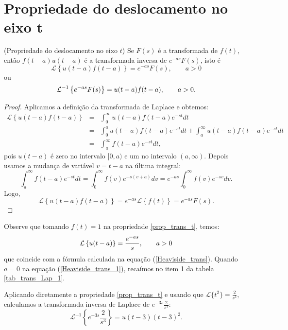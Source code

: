  \section{Propriedade do deslocamento no eixo t}
\begin{teo}{\label{prop_trans_t}}(Propriedade do deslocamento no eixo $t$) Se $F(s)$ é a transformada de $f(t)$, então $f(t-a)u(t-a)$ é a transformada inversa de $e^{-as}F(s)$, isto é
\begin{equation}
\mathcal{L}\left\{u(t-a)f(t-a)\right\} =e^{-as}F(s),\qquad a>0
\end{equation}
ou
\begin{equation}{\label{eq_trans_t_inv}}
\mathcal{L}^{-1} \left\{e^{-as}F(s)\right\} =u(t-a)f(t-a),\qquad a>0.
\end{equation}
\end{teo}
\begin{proof}Aplicamos a definição da transformada de Laplace e obtemos:
\begin{eqnarray*}
\mathcal{L}\left\{u(t-a)f(t-a)\right\}&=&\int_0^\infty u(t-a)f(t-a)e^{-st}dt\\
&=&\int_0^a u(t-a)f(t-a)e^{-st}dt+\int_a^\infty u(t-a)f(t-a)e^{-st}dt\\
&=&\int_a^\infty f(t-a)e^{-st}dt,
\end{eqnarray*}
pois $u(t-a)$ é zero no intervalo $[0,a)$ e um no intervalo $(a,\infty)$. Depois usamos a mudança de variável $v=t-a$ na última integral:
\begin{equation*}
\int_a^\infty f(t-a)e^{-st}dt=\int_0^\infty f(v)e^{-s(v+a)}dv=e^{-as}\int_0^\infty f(v)e^{-sv}dv.
\end{equation*}
Logo,
\begin{equation}
\mathcal{L}\left\{u(t-a)f(t-a)\right\}=e^{-as}\mathcal{L}\left\{f(t)\right\}=e^{-as}F(s).
\end{equation}
\end{proof}
Observe que tomando $f(t)=1$ na propriedade \ref{prop_trans_t}, temos:
\begin{equation}{\label{Heaviside_trans_1}}
\mathcal{L}\left\{u(t-a)\right\} =\frac{e^{-as}}{s},\qquad a>0
\end{equation}
que coincide com a fórmula calculada na equação (\ref{Heaviside_trans}). Quando $a=0$ na equação (\ref{Heaviside_trans_1}), recaímos no item 1 da tabela \ref{tab_trans_Lap_1}.
\begin{ex} Aplicando diretamente a propriedade \ref{prop_trans_t} e usando que $\mathcal{L}\{t^2\}=\frac{2}{s^3}$, calculamos a transformada inversa de Laplace de $e^{-3s}\frac{2}{s^3}$:
\begin{equation}
\mathcal{L}^{-1}\left\{e^{-3s}\frac{2}{s^3}\right\}=u(t-3)(t-3)^2.
\end{equation}
\end{ex}
